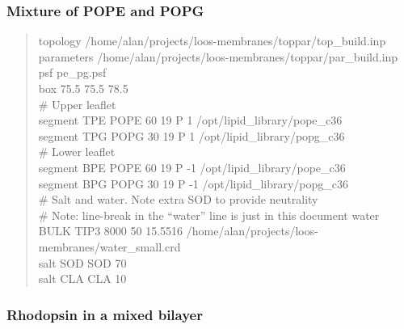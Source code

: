 \documentclass[12pt]{article}
\begin{document}
\subsubsection{Mixture of POPE and POPG}

\begin{quote}
topology /home/alan/projects/loos-membranes/toppar/top\_build.inp \\
parameters /home/alan/projects/loos-membranes/toppar/par\_build.inp \\
psf      pe\_pg.psf \\
box      75.5  75.5  78.5 \\

\# Upper leaflet \\
segment TPE       POPE     60    19    P 1      /opt/lipid\_library/pope\_c36 \\
segment TPG       POPG     30    19    P 1      /opt/lipid\_library/popg\_c36 \\

\# Lower leaflet \\
segment BPE       POPE     60    19   P -1      /opt/lipid\_library/pope\_c36 \\
segment BPG       POPG     30    19   P -1      /opt/lipid\_library/popg\_c36 \\

\# Salt and water.  Note extra SOD to provide neutrality \\
\# Note: line-break in the ``water'' line is just in this document
water   BULK     TIP3      8000       50      15.5516 /home/alan/projects/loos-membranes/water\_small.crd \\
salt    SOD       SOD      70 \\
salt    CLA       CLA      10 \\

\end{quote}

\subsubsection{Rhodopsin in a mixed bilayer}
\end{document}

